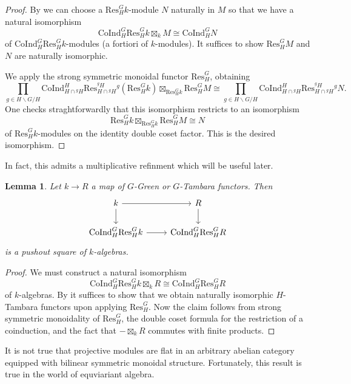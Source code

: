 \documentclass[11pt,dvipsnames]{amsart}
\newtheorem{lemma}[theorem]{Lemma}
\theoremstyle{BoldRemark}
\newcommand{\Res}{\mathrm{Res}}
\newcommand{\Coind}{\mathrm{CoInd}}
\begin{document}
\begin{proof}
    By \cite[Theorem F]{Wis25a} we can choose a $\Res_H^G k$-module $N$ naturally in $M$ so that we have a natural isomorphism 
    \[ 
        \Coind_H^G \Res_H^G k \boxtimes_k M \cong \Coind_H^G N 
    \] 
    of $\Coind_H^G \Res_H^G k$-modules (a fortiori of $k$-modules). It suffices to show $\Res_H^G M$ and $N$ are naturally isomorphic. 
    
    We apply the strong symmetric monoidal functor $\Res_H^G$, obtaining 
    \[ 
        \prod_{g \in H \backslash G / H} \Coind_{H \cap {}^g H}^H \Res_{H \cap {}^g H}^{{}^g H} {}^g (\Res_H^G k) \boxtimes_{\Res_H^G k} \Res_H^G M \cong \prod_{g \in H \backslash G / H} \Coind_{H \cap {}^g H}^H \Res_{H \cap {}^g H}^{{}^g H} {}^g N .
    \] 
    One checks straghtforwardly that this isomorphism restricts to an isomorphism 
    \[ 
       \Res_H^G k \boxtimes_{\Res_H^G k} \Res_H^G M \cong N 
    \] 
    of $\Res_H^G k$-modules on the identity double coset factor. This is the desired isomorphism.
\end{proof}

In fact, this admits a multiplicative refinment which will be useful later.

\begin{lemma}\label{lem:coind-adj-unit-is-base-changed}
    Let $k \rightarrow R$ a map of $G$-Green or $G$-Tambara functors. Then 
    \[ \begin{tikzcd} 
    k \arrow[r] \arrow[d] & R \arrow[d] \\
    \Coind_H^G \Res_H^G k \arrow[r] & \Coind_H^G \Res_H^G R 
    \end{tikzcd} \]
    is a pushout square of $k$-algebras.
\end{lemma}

\begin{proof}
    We must construct a natural isomorphism 
    \[ 
        \Coind_H^G \Res_H^G k \boxtimes_k R \cong \Coind_H^G \Res_H^G R 
    \] 
    of $k$-algebras. By \cite[Theorem F and Proposition 5.8]{Wis25a} it suffices to show that we obtain naturally isomorphic $H$-Tambara functors upon applying $\Res_H^G$. Now the claim follows from strong symmetric monoidality of $\Res_H^G$, the double coset formula for the restriction of a coinduction, and the fact that $- \boxtimes_k R$ commutes with finite products.
\end{proof}

It is not true that projective modules are flat in an arbitrary abelian category equipped with bilinear symmetric monoidal structure. Fortunately, this result is true in the world of equviariant algebra.
\end{document}
